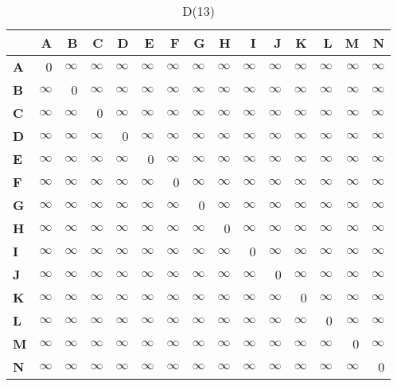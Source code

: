 \documentclass{article}
\newcommand{\INF}{$\infty$}
\begin{document}
\begin{table}[H]\centering
\caption{D(13)}
\begin{tabular}{l r r r r r r r r r r r r r r}
\toprule
 & \textbf{A} & \textbf{B} & \textbf{C} & \textbf{D} & \textbf{E} & \textbf{F} & \textbf{G} & \textbf{H} & \textbf{I} & \textbf{J} & \textbf{K} & \textbf{L} & \textbf{M} & \textbf{N}\\\midrule
\textbf{A} & 0 & \INF & \INF & \INF & \INF & \INF & \INF & \INF & \INF & \INF & \INF & \INF & \INF & \INF \\
\textbf{B} & \INF & 0 & \INF & \INF & \INF & \INF & \INF & \INF & \INF & \INF & \INF & \INF & \INF & \INF \\
\textbf{C} & \INF & \INF & 0 & \INF & \INF & \INF & \INF & \INF & \INF & \INF & \INF & \INF & \INF & \INF \\
\textbf{D} & \INF & \INF & \INF & 0 & \INF & \INF & \INF & \INF & \INF & \INF & \INF & \INF & \INF & \INF \\
\textbf{E} & \INF & \INF & \INF & \INF & 0 & \INF & \INF & \INF & \INF & \INF & \INF & \INF & \INF & \INF \\
\textbf{F} & \INF & \INF & \INF & \INF & \INF & 0 & \INF & \INF & \INF & \INF & \INF & \INF & \INF & \INF \\
\textbf{G} & \INF & \INF & \INF & \INF & \INF & \INF & 0 & \INF & \INF & \INF & \INF & \INF & \INF & \INF \\
\textbf{H} & \INF & \INF & \INF & \INF & \INF & \INF & \INF & 0 & \INF & \INF & \INF & \INF & \INF & \INF \\
\textbf{I} & \INF & \INF & \INF & \INF & \INF & \INF & \INF & \INF & 0 & \INF & \INF & \INF & \INF & \INF \\
\textbf{J} & \INF & \INF & \INF & \INF & \INF & \INF & \INF & \INF & \INF & 0 & \INF & \INF & \INF & \INF \\
\textbf{K} & \INF & \INF & \INF & \INF & \INF & \INF & \INF & \INF & \INF & \INF & 0 & \INF & \INF & \INF \\
\textbf{L} & \INF & \INF & \INF & \INF & \INF & \INF & \INF & \INF & \INF & \INF & \INF & 0 & \INF & \INF \\
\textbf{M} & \INF & \INF & \INF & \INF & \INF & \INF & \INF & \INF & \INF & \INF & \INF & \INF & 0 & \INF \\
\textbf{N} & \INF & \INF & \INF & \INF & \INF & \INF & \INF & \INF & \INF & \INF & \INF & \INF & \INF & 0 \\
\bottomrule
\end{tabular}
\end{table}
\end{document}
